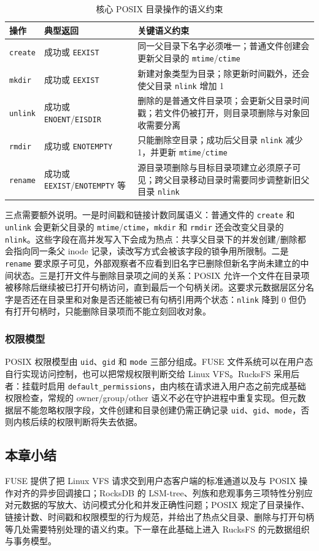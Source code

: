 \begin{table}[htbp]
    \centering
    \caption{核心 POSIX 目录操作的语义约束}
    \label{tab:posix_ops}
    \small
    \begin{tabular}{llp{7.2cm}}
    \toprule
    \textbf{操作} & \textbf{典型返回} & \textbf{关键语义约束} \\
    \midrule
    \texttt{create} & 成功或 \texttt{EEXIST} & 同一父目录下名字必须唯一；普通文件创建会更新父目录的 \texttt{mtime}/\texttt{ctime} \\
    \texttt{mkdir} & 成功或 \texttt{EEXIST} & 新建对象类型为目录；除更新时间戳外，还会使父目录 \texttt{nlink} 增加 1 \\
    \texttt{unlink} & 成功或 \texttt{ENOENT}/\texttt{EISDIR} & 删除的是普通文件目录项；会更新父目录时间戳；若文件仍被打开，则目录项删除与对象回收需要分离 \\
    \texttt{rmdir} & 成功或 \texttt{ENOTEMPTY} & 只能删除空目录；成功后父目录 \texttt{nlink} 减少 1，并更新 \texttt{mtime}/\texttt{ctime} \\
    \texttt{rename} & 成功或 \texttt{EEXIST}/\texttt{ENOTEMPTY} 等 & 源目录项删除与目标目录项建立必须原子可见；跨父目录移动目录时需要同步调整新旧父目录 \texttt{nlink} \\
    \bottomrule
    \end{tabular}
\end{table}

三点需要额外说明。一是时间戳和链接计数同属语义：普通文件的 \texttt{create} 和 \texttt{unlink} 会更新父目录的 \texttt{mtime}/\texttt{ctime}，\texttt{mkdir} 和 \texttt{rmdir} 还会改变父目录的 \texttt{nlink}。这些字段在高并发写入下会成为热点：共享父目录下的并发创建/删除都会指向同一条父 inode 记录，读改写方式会被该字段的锁争用所限制。二是 \texttt{rename} 要求原子可见，外部观察者不应看到旧名字已删除但新名字尚未建立的中间状态。三是打开文件与删除目录项之间的关系：POSIX 允许一个文件在目录项被移除后继续被已打开句柄访问，直到最后一个句柄关闭。这要求元数据层区分名字是否还在目录里和对象是否还能被已有句柄引用两个状态：\texttt{nlink} 降到 0 但仍有打开句柄时，只能删除目录项而不能立刻回收对象。

\subsubsection{权限模型}

POSIX 权限模型由 \texttt{uid}、\texttt{gid} 和 \texttt{mode} 三部分组成。FUSE 文件系统可以在用户态自行实现访问控制，也可以把常规权限判断交给 Linux VFS。RucksFS 采用后者：挂载时启用 \texttt{default\_permissions}，由内核在请求进入用户态之前完成基础权限检查，常规的 owner/group/other 语义不必在守护进程中重复实现。但元数据层不能忽略权限字段，文件创建和目录创建仍需正确记录 \texttt{uid}、\texttt{gid}、\texttt{mode}，否则内核后续的权限判断将失去依据。

\subsection{本章小结}

FUSE 提供了把 Linux VFS 请求交到用户态客户端的标准通道以及与 POSIX 操作对齐的异步回调接口；RocksDB 的 LSM-tree、列族和悲观事务三项特性分别应对元数据的写放大、访问模式分化和并发正确性问题；POSIX 规定了目录操作、链接计数、时间戳和权限模型的行为规范，并给出了热点父目录、删除与打开句柄等几处需要特别处理的语义约束。下一章在此基础上进入 RucksFS 的元数据组织与事务模型。
